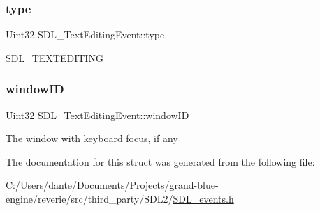 \subsubsection{\texorpdfstring{type}{type}}
{\footnotesize\ttfamily Uint32 S\+D\+L\+\_\+\+Text\+Editing\+Event\+::type}

\mbox{\hyperlink{_s_d_l__events_8h_a3b589e89be6b35c02e0dd34a55f3fccaa1b80c465df69c0b6d06f026ce7a230e3}{S\+D\+L\+\_\+\+T\+E\+X\+T\+E\+D\+I\+T\+I\+NG}} \mbox{\label{struct_s_d_l___text_editing_event_a23b3e414cf7a7ccc547b7595ca930049}} 
\subsubsection{\texorpdfstring{windowID}{windowID}}
{\footnotesize\ttfamily Uint32 S\+D\+L\+\_\+\+Text\+Editing\+Event\+::window\+ID}

The window with keyboard focus, if any 

The documentation for this struct was generated from the following file\+:\begin{DoxyCompactItemize}
\item 
C\+:/\+Users/dante/\+Documents/\+Projects/grand-\/blue-\/engine/reverie/src/third\+\_\+party/\+S\+D\+L2/\mbox{\hyperlink{_s_d_l__events_8h}{S\+D\+L\+\_\+events.\+h}}\end{DoxyCompactItemize}
